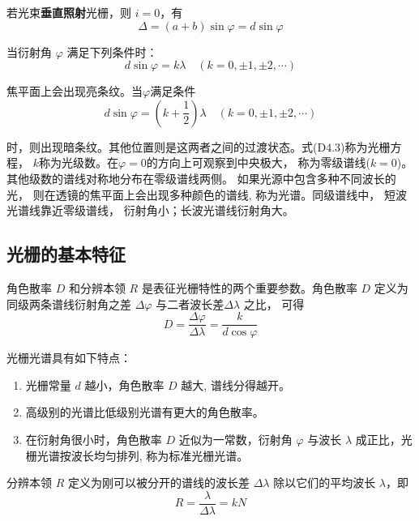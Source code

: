 \documentclass[a4paper,8pt,twocolumn]{article}
\begin{document}
  若光束\textbf{垂直照射}光栅，则 $i=0$，有
  \begin{equation}
    \Delta = (a+b)\sin\varphi = d\sin\varphi
  \end{equation}

  当衍射角 $\varphi$ 满足下列条件时：
  \begin{equation}
    d\sin\varphi = k\lambda \quad (k=0, \pm 1, \pm 2, \cdots)
  \end{equation}

  焦平面上会出现亮条纹。当$\varphi$满足条件
  \begin{equation}
    d\sin\varphi = \left(k + \frac{1}{2}\right)\lambda \quad (k=0, \pm 1, \pm 2, \cdots)
  \end{equation}

  \noindent
  时，则出现暗条纹。其他位置则是这两者之间的过渡状态。式($\mathrm{D4.3}$)称为光栅方程， $k$称为光级数。在$\varphi=0$的方向上可观察到中央极大， 称为零级谱线($k=0$)。 其他级数的谱线对称地分布在零级谱线两侧。 如果光源中包含多种不同波长的光， 则在透镜的焦平面上会出现多种颜色的谱线, 称为光谱。同级谱线中， 短波光谱线靠近零级谱线， 衍射角小；长波光谱线衍射角大。
  
 \subsection{光栅的基本特征}
  角色散率 $D$ 和分辨本领 $R$ 是表征光栅特性的两个重要参数。角色散率 $D$ 定义为同级两条谱线衍射角之差 $\Delta\varphi$ 与二者波长差$\Delta\lambda$ 之比， 可得
  \begin{equation}
    D = \frac{\Delta\varphi}{\Delta\lambda} = \frac{k}{d\cos\varphi}
  \end{equation}

  光栅光谱具有如下特点：
  \begin{enumerate}
    \item 光栅常量 $d$ 越小，角色散率 $D$ 越大, 谱线分得越开。
    \item 高级别的光谱比低级别光谱有更大的角色散率。
    \item 在衍射角很小时，角色散率 $D$ 近似为一常数，衍射角 $\varphi$ 与波长 $\lambda$ 成正比，光栅光谱按波长均匀排列, 称为标准光栅光谱。
  \end{enumerate}

  分辨本领 $R$ 定义为刚可以被分开的谱线的波长差 $\Delta\lambda$ 除以它们的平均波长 $\lambda$，即
  \begin{equation}
   R = \frac{\lambda}{\Delta\lambda} = kN
  \end{equation}
\end{document}
